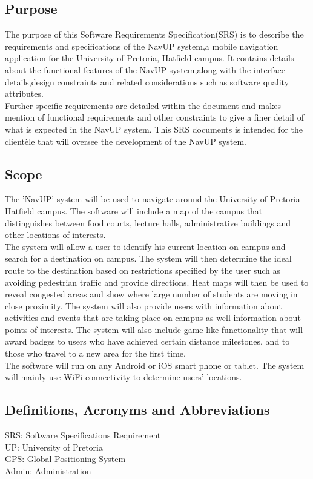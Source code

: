 \documentclass[a4paper,12pt]{article}
\begin{document}
\subsection{Purpose}
The purpose of this Software Requirements Specification(SRS) is to describe the requirements and specifications of the NavUP system,a mobile navigation application for the University of Pretoria, Hatfield campus. It contains details about the functional features of the NavUP system,along with the interface details,design constraints and related considerations such as software quality attributes. \\
Further specific requirements are detailed within the document and makes mention of functional requirements and other constraints to give a finer detail of what is expected in the NavUP system. This SRS documents is intended for the clientèle that will oversee the development of the NavUP system.
\subsection{Scope}
The 'NavUP' system will be used to navigate around the University of Pretoria Hatfield campus. The software will include a map of the campus that distinguishes between food courts, lecture halls, administrative buildings and other locations of interests.\\
The system will allow a user to identify his current location on campus and search for a destination on campus. The system will then determine the ideal route to the destination based on restrictions specified by the user such as avoiding pedestrian traffic
and provide directions. Heat maps will then be used to reveal congested areas and show where large number of students are moving in close proximity. The system will also provide users with information about activities and events that are taking place on campus as well information about points of interests.  
The system will also include game-like functionality that will award badges to users who have achieved certain distance milestones, and to those who travel to a new area for the first time.\\
The software will run on any Android or iOS smart phone or tablet. The system will mainly use WiFi connectivity to determine users' locations.
\subsection{Definitions, Acronyms and Abbreviations}
SRS:	Software Specifications Requirement\\
UP:		University of Pretoria\\
GPS:	Global Positioning System \\
Admin:  Administration
\end{document}
